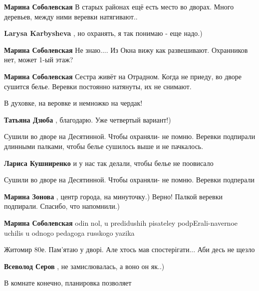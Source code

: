 \begin{itemize}
\begin{itemize}
\begin{itemize} %
\textbf{Марина Соболевская} В старых районах ещё есть место во дворах. Много деревьев, между ними веревки натягивают..

\textbf{Larysa Karbysheva} , но охранять, я так понимаю - еще надо.)

\textbf{Марина Соболевская} Не знаю.... Из Окна вижу как развешивают. Охранников нет, может 1-ый этаж?

\textbf{Марина Соболевская} Сестра живёт на Отрадном. Когда не приеду, во дворе сушится белье. Веревки постоянно натянуты, их не снимают.
\end{itemize} %

\end{itemize} %

В духовке, на веровке и немножко на чердак!

\textbf{Татьяна Дзюба} , благодарю. Уже четвертый вариант!)


Сушили во дворе на Десятинной. Чтобы охраняли- не помню. Веревки подпирали
длинными палками, чтобы белье сушилось выше и не пачкалось.

\textbf{Лариса Кушниренко} и у нас так делали, чтобы белье не поовисало

Сушили во дворе на Десятинной. Чтобы охраняли- не помню. Веревки подперали

\begin{itemize} %
\textbf{Марина Зонова} , центр города, на минуточку.) Верно! Палкой веревки подпирали. Спасибо, что напомнили.)

\textbf{Марина Соболевская} odin nol, u predidushih pisateley podpErali-navernoe uchilis u odnogo pedagoga russkogo yazika
\end{itemize} %


Житомир 80е. Пам'ятаю у дворі. Але хтось мав спостерігати... Аби десь не щезло

\textbf{Всеволод Серов} , не замислювалась, а воно он як..)

В комнате конечно, планировка позволяет



\end{itemize}
